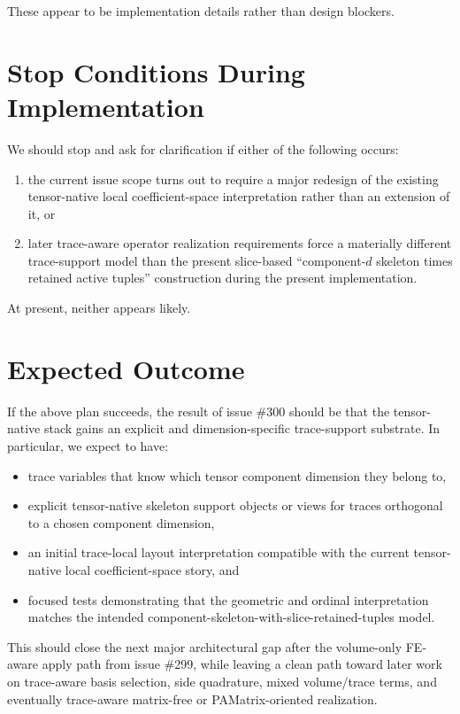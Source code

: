 \documentclass[11pt]{article}
\begin{document}
These appear to be implementation details rather than design blockers.

\section{Stop Conditions During Implementation}

We should stop and ask for clarification if either of the following occurs:
\begin{enumerate}[leftmargin=2em]
  \item the current issue scope turns out to require a major redesign of the existing tensor-native local coefficient-space interpretation rather than an extension of it, or
  \item later trace-aware operator realization requirements force a materially different trace-support model than the present slice-based ``component-$d$ skeleton times retained active tuples'' construction during the present implementation.
\end{enumerate}

At present, neither appears likely.

\section{Expected Outcome}

If the above plan succeeds, the result of issue \#300 should be that the tensor-native stack gains an explicit and dimension-specific trace-support substrate. In particular, we expect to have:
\begin{itemize}[leftmargin=2em]
  \item trace variables that know which tensor component dimension they belong to,
  \item explicit tensor-native skeleton support objects or views for traces orthogonal to a chosen component dimension,
  \item an initial trace-local layout interpretation compatible with the current tensor-native local coefficient-space story, and
  \item focused tests demonstrating that the geometric and ordinal interpretation matches the intended component-skeleton-with-slice-retained-tuples model.
\end{itemize}

This should close the next major architectural gap after the volume-only FE-aware apply path from issue \#299, while leaving a clean path toward later work on trace-aware basis selection, side quadrature, mixed volume/trace terms, and eventually trace-aware matrix-free or PAMatrix-oriented realization.
\end{document}
